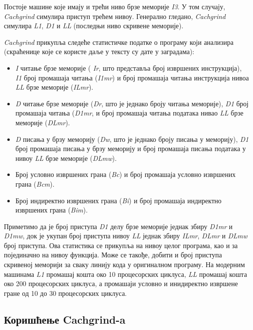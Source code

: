 \documentclass[12pt,oneside]{memoir}
\begin{document}
\indent Постоје машине које имају и трећи ниво брзе меморије \textit{I3}. У том случају, \textit{Cachgrind} симулира приступ трећем нивоу. Генерално гледано, \textit{Cachgrind} симулира  \textit{L1}, \textit{D1} и \textit{LL} (последњи ниво скривене меморије).

\indent \textit{Cachgrind} прикупља следеће статистичке податке о програму који анализира (скраћенице које се користе даље у тексту су дате у заградама):

\begin{itemize}
  \item \textit{I} читање брзе меморије ( \textit{Ir}, што представља број извршених инструкција), \textit{I1} број промашаја читања (\textit{I1mr}) и број промашаја читања инструкција нивоа \textit{LL} брзе меморије (\textit{ILmr}).
  \item \textit{D} читање брзе меморије (\textit{Dr}, што је једнако броју читања меморије), \textit{D1} број промашаја читања (\textit{D1mr}, и број промашаја читања података нивао \textit{LL} брзе меморије (\textit{DLmr}).
  \item \textit{D} писања у брзу меморију (\textit{Dw}, што је једнако броју писања у меморију), \textit{D1} број промашаја писања у брзу меморију и број промашаја писања података у нивоу \textit{LL} брзе меморије (\textit{DLmw}).
  \item Број условно извршених грана (\textit{Bc}) и број промашаја условно извршених грана (\textit{Bcm}).
  \item Број индиректно извршених грана (\textit{Bi}) и број промашаја индиректно извршених грана (\textit{Bim}).
\end{itemize}

\indent Приметимо да је број приступа \textit{D1} делу брзе меморије једнак збиру \textit{D1mr} и \textit{D1mw}, док је укупан број приступа нивоу \textit{LL} једнак збиру  \textit{ILmr}, \textit{DLmr} и \textit{DLmw} број приступа. Ова статистика се прикупља на нивоу целог програма, као и за појединачно на нивоу функција. Може се такође, добити и број приступа скривеној меморији за сваку линију кода у оригиналном програму. На модерним машинама \textit{L1} промашај кошта око 10 процесорских циклуса, \textit{LL} промашај кошта око 200 процесорских циклуса, а промашаји условно и инидиректно извршене гране од 10 до 30 процесорских циклуса.

\subsection{Коришћење Cachgrind-a}
\end{document}
